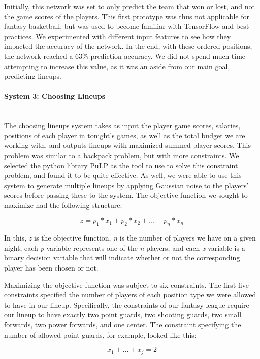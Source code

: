 Initially, this network was set to only predict the team that won or lost, and not the game scores of the players. This first prototype was thus not applicable for fantasy basketball, but was used to become familiar with TensorFlow and best practices. We experimented with different input features to see how they impacted the accuracy of the network. In the end, with these ordered positions, the network reached a 63\% prediction accuracy. %
We did not spend much time attempting to increase this value, as it was an aside from our main goal, predicting lineups.


\paragraph{System 3: Choosing Lineups}\mbox{}\\
The choosing lineups system takes as input the player game scores, salaries, positions of each player in tonight's games, as well as the total budget we are working with, and outputs lineups with maximized summed player scores. This problem was similar to a backpack problem, but with more constraints. We selected the python library PuLP as the tool to use to solve this constraint problem, and found it to be quite effective. As well, we were able to use this system to generate multiple lineups by applying Gaussian noise to the players' scores before passing these to the system.
The objective function we sought to maximize had the following structure:

\[ z = p_1*x_1 + p_2*x_2 + ... + p_n*x_n \]

In this, \textit{z} is the objective function, \textit{n} is the number of players we have on a given night, each \textit{p} variable represents one of the \textit{n} players, and each \textit{x} variable is a binary decision variable that will indicate whether or not the corresponding player has been chosen or not.

Maximizing the objective function was subject to six constraints. The first five constraints specified the number of players of each position type we were allowed to have in our lineup. Specifically, the constraints of our fantasy league require our lineup to have exactly two point guards, two shooting guards, two small forwards, two power forwards, and one center. The constraint specifying the number of allowed point guards, for example, looked like this:

\[ x_1 + ... + x_j = 2 \]

